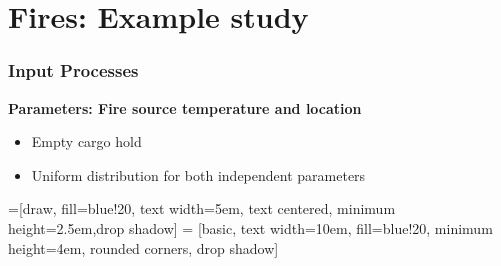 \documentclass[9pt]{beamer}
\begin{document}
\section{Fires: Example study}
\label{sec-7}
\begin{frame}
\frametitle{Input Processes}
\label{sec-7-1}

\textbf{Parameters: Fire source temperature and location}
\begin{itemize}
\item Empty cargo hold
\item Uniform distribution for both independent parameters
\end{itemize}
\fontsize{9}\selectfont


=[draw, fill=blue!20, text width=5em, 
    text centered, minimum height=2.5em,drop shadow]
 = [basic, text width=10em, fill=blue!20, 
    minimum height=4em, rounded corners, drop shadow]


\end{frame}
\end{document}
